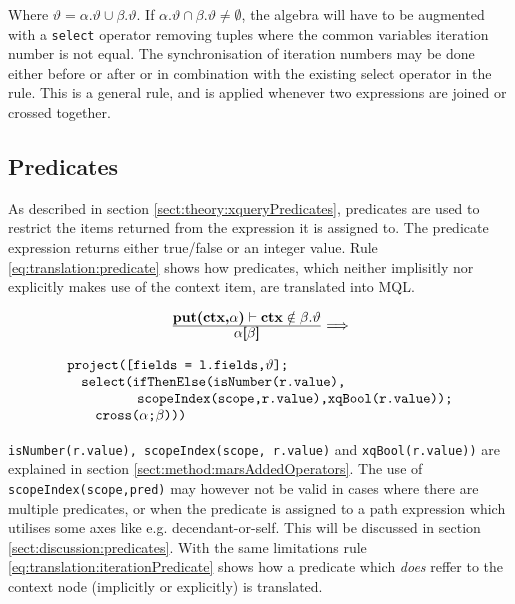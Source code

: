 Where $\vartheta = \alpha.\vartheta \cup \beta.\vartheta$. If $\alpha.\vartheta \cap \beta.\vartheta \neq
\emptyset$, the algebra will have to be augmented with a \texttt{select} operator removing tuples where the common
variables iteration number is not equal. The synchronisation of iteration numbers may be done either before or
after or in combination with the existing \textsf{select} operator in the rule. This is a general rule, and is
applied whenever two expressions are joined or crossed together.

\subsection{Predicates}
\label{sect:translation:mXr:predicates}
As described in section \ref{sect:theory:xqueryPredicates}, predicates are used to restrict the items returned
from the expression it is assigned to. The predicate expression returns either true/false or an integer value. Rule
\ref{eq:translation:predicate} shows how predicates, which neither implisitly nor explicitly makes use of the
context item, are translated into MQL. 

\begin{equation}
\centering
\begin{array}{c}
	\frac{\displaystyle \textbf{put(ctx,}\alpha\textbf{)}\vdash\textbf{ctx}\notin\beta.\vartheta}
	{\displaystyle \alpha\textsf{[}\beta\textsf{]}}

	\Longrightarrow 
	\\
	\mbox{}
	\\
	\begin{array}{l}
		\mbox{\texttt{project([fields = l.fields,}} \vartheta \mbox{\texttt{];}} 
		\\ \quad \mbox{\texttt{select(ifThenElse(isNumber(r.value),}} \\ \quad 
		\qquad\qquad \mbox{\texttt{scopeIndex(scope,r.value),xqBool(r.value));}} \\ \quad\quad
		\mbox{\texttt{cross(}} 
		\alpha \texttt{;}
		\beta \mbox{\texttt{)))}}
	\end{array}
\end{array}
\label{eq:translation:predicate}
\end{equation}


\texttt{isNumber(r.value), scopeIndex(scope, r.value)} and \texttt{xqBool(r.value))} are explained in section
\ref{sect:method:marsAddedOperators}. The use of \texttt{scopeIndex(scope,pred)} may however not be valid in cases
where there are multiple predicates, or when the predicate is assigned to a path expression which utilises some
axes like e.g. \textsf{decendant-or-self}. This will be discussed in section \ref{sect:discussion:predicates}.
With the same limitations rule \ref{eq:translation:iterationPredicate} shows how a predicate which \emph{does}
reffer to the context node (implicitly or explicitly) is translated.

